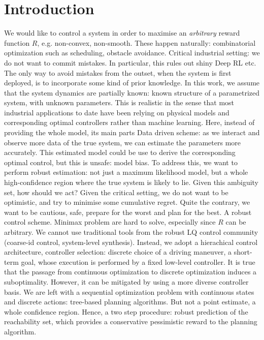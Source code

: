 \documentclass{article}
\begin{document}
	\begin{abstract}
		
	\end{abstract}

\section{Introduction}

We would like to control a system in order to maximise an \textit{arbitrary} reward function $R$, e.g. non-convex, non-smooth. These happen naturally: combinatorial optimization such as scheduling, obstacle avoidance.
Critical industrial setting: we do not want to commit mistakes. 
In particular, this rules out shiny Deep RL etc.
The only way to avoid mistakes from the outset, when the system is first deployed, is to incorporate some kind of prior knowledge. In this work, we assume that the system dynamics are partially known: known structure of a parametrized system, with unknown parameters. This is realistic in the sense that most industrial applications to date have been relying on physical models and corresponding optimal controllers rather than machine learning. Here, instead of providing the whole model, its main parts  
Data driven scheme: as we interact and observe more data of the true system, we can estimate the parameters more accurately.
This estimated model could be use to derive the corresponding optimal control, but this is unsafe: model bias.
To address this, we want to perform robust estimation: not just a maximum likelihood model, but a whole high-confidence region where the true system is likely to lie.
Given this ambiguity set, how should we act? Given the critical setting, we do not want to be optimistic, and try to minimise some cumulative regret. Quite the contrary, we want to be cautious, safe, prepare for the worst and plan for the best. A robust control scheme. Minimax problem are hard to solve, especially since $R$ can be arbitrary. We cannot use traditional tools from the robust LQ control community (coarse-id control, system-level synthesis). Instead, we adopt a hierachical control architecture, controller selection: discrete choice of a driving maneuver, a short-term goal, whose execution is performed by a fixed low-level controller. It is true that the passage from continuous optimization to discrete optimization induces a suboptimality. However, it can be mitigated by using a more diverse controller basis. We are left with a sequential optimization problem with continuous states and discrete actions: tree-based planning algorithms. But not a point estimate, a whole confidence region. Hence, a two step procedure: robust prediction of the reachability set, which provides a conservative pessimistic reward to the planning algorithm.
\end{document}
